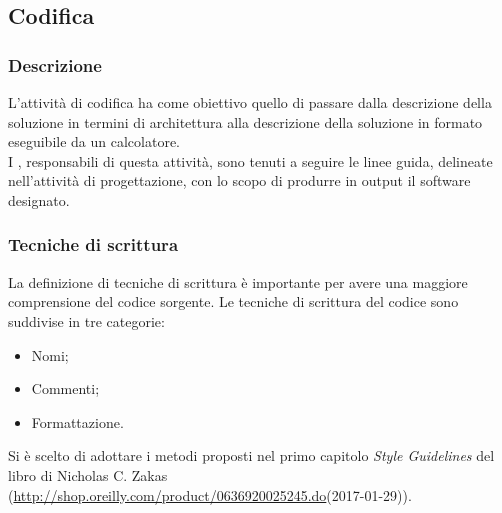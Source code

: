 \documentclass[../NormeDiProgetto.tex]{subfiles}
\begin{document}
      \subsection{Codifica}
            \subsubsection{Descrizione}
                  L'attività di codifica ha come obiettivo quello di passare dalla descrizione della soluzione in termini di architettura alla descrizione della soluzione in formato eseguibile da un calcolatore. \\ I \programmatori, responsabili di questa attività, sono tenuti a seguire le linee guida, delineate nell'attività di progettazione, con lo scopo di produrre in output il software designato.

            \subsubsection{Tecniche di scrittura}
                  La definizione di tecniche di scrittura è importante per avere una maggiore comprensione del codice sorgente. Le tecniche di scrittura del codice sono suddivise in tre categorie:
                  \begin{itemize}
                        \item Nomi;
                        \item Commenti;
                        \item Formattazione.
                  \end{itemize}
                  Si è scelto di adottare i metodi proposti nel primo capitolo \textit{Style Guidelines} del libro  di Nicholas C. Zakas (\url{http://shop.oreilly.com/product/0636920025245.do}(2017-01-29)).
                  
\end{document}
